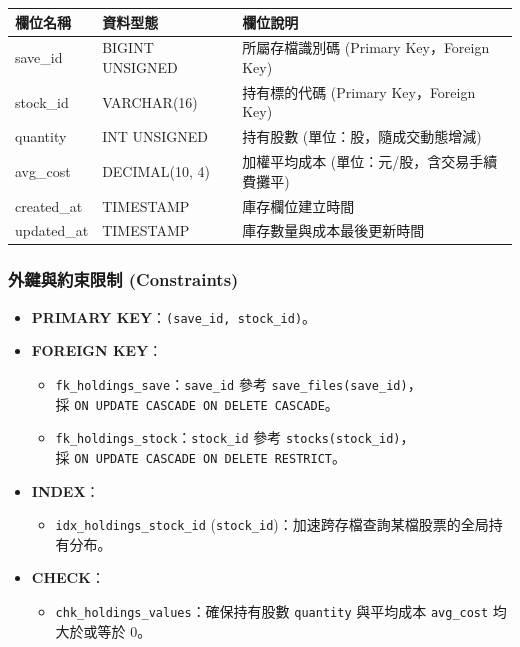 \documentclass[UTF8, a4paper, 12pt, fontset=none]{ctexart}
\begin{document}
    \begin{center}
    \begin{tabular}{|l|l|p{8cm}|}
    \hline
    \textbf{欄位名稱} & \textbf{資料型態} & \textbf{欄位說明} \\ \hline
    save\_id & BIGINT UNSIGNED & 所屬存檔識別碼 (Primary Key，Foreign Key) \\ \hline
    stock\_id & VARCHAR(16) & 持有標的代碼 (Primary Key，Foreign Key) \\ \hline
    quantity & INT UNSIGNED & 持有股數 (單位：股，隨成交動態增減) \\ \hline
    avg\_cost & DECIMAL(10, 4) & 加權平均成本 (單位：元/股，含交易手續費攤平) \\ \hline
    created\_at & TIMESTAMP & 庫存欄位建立時間 \\ \hline
    updated\_at & TIMESTAMP & 庫存數量與成本最後更新時間 \\ \hline
    \end{tabular}
    \end{center}

    \subsubsection*{外鍵與約束限制 (Constraints)}
    \begin{itemize}
        \item \textbf{PRIMARY KEY}：\texttt{(save\_id, stock\_id)}。
        \item \textbf{FOREIGN KEY}：
            \begin{itemize}
                \item \texttt{fk\_holdings\_save}：\texttt{save\_id} 參考 \texttt{save\_files(save\_id)}，\\採 \texttt{ON UPDATE CASCADE ON DELETE CASCADE}。
                \item \texttt{fk\_holdings\_stock}：\texttt{stock\_id} 參考 \texttt{stocks(stock\_id)}，\\採 \texttt{ON UPDATE CASCADE ON DELETE RESTRICT}。
            \end{itemize}
        \item \textbf{INDEX}：
            \begin{itemize}
                \item \texttt{idx\_holdings\_stock\_id} (\texttt{stock\_id})：加速跨存檔查詢某檔股票的全局持有分布。
            \end{itemize}
        \item \textbf{CHECK}：
            \begin{itemize}
                \item \texttt{chk\_holdings\_values}：確保持有股數 \texttt{quantity} 與平均成本 \texttt{avg\_cost} 均大於或等於 0。
            \end{itemize}
    \end{itemize}
\end{document}
